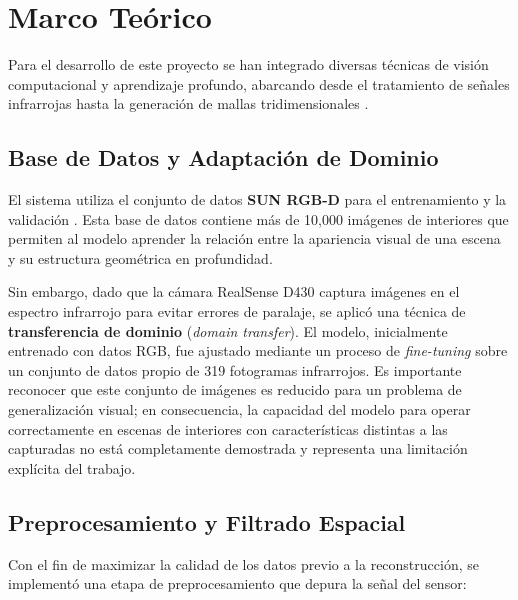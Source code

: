 \documentclass[12pt, a4, twoside, openany]{report}
\begin{document}
\chapter{Marco Teórico}

Para el desarrollo de este proyecto se han integrado diversas técnicas de visión computacional y aprendizaje profundo, abarcando desde el tratamiento de señales infrarrojas hasta la generación de mallas tridimensionales \cite{li2022high,tychola20223d}.

\section{Base de Datos y Adaptación de Dominio}

El sistema utiliza el conjunto de datos \textbf{SUN RGB-D} para el entrenamiento y la validación \cite{song2015sun}. Esta base de datos contiene más de 10{,}000 imágenes de interiores que permiten al modelo aprender la relación entre la apariencia visual de una escena y su estructura geométrica en profundidad.

Sin embargo, dado que la cámara RealSense D430 captura imágenes en el espectro infrarrojo para evitar errores de paralaje, se aplicó una técnica de \textbf{transferencia de dominio} (\textit{domain transfer}). El modelo, inicialmente entrenado con datos RGB, fue ajustado mediante un proceso de \textit{fine-tuning} sobre un conjunto de datos propio de 319 fotogramas infrarrojos. Es importante reconocer que este conjunto de imágenes es reducido para un problema de generalización visual; en consecuencia, la capacidad del modelo para operar correctamente en escenas de interiores con características distintas a las capturadas no está completamente demostrada y representa una limitación explícita del trabajo.


\section{Preprocesamiento y Filtrado Espacial}

Con el fin de maximizar la calidad de los datos previo a la reconstrucción, se implementó una etapa de preprocesamiento que depura la señal del sensor:
\end{document}
